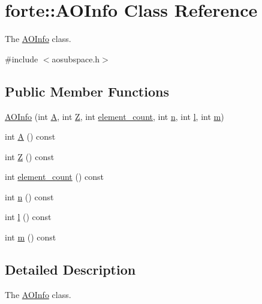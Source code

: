 \hypertarget{classforte_1_1_a_o_info}{}\section{forte\+:\+:A\+O\+Info Class Reference}
\label{classforte_1_1_a_o_info}


The \mbox{\hyperlink{classforte_1_1_a_o_info}{A\+O\+Info}} class.  




{\ttfamily \#include $<$aosubspace.\+h$>$}

\subsection*{Public Member Functions}
\begin{DoxyCompactItemize}
\item 
\mbox{\hyperlink{classforte_1_1_a_o_info_a74a368c1fa1b7cd773d3b6a040d0b57f}{A\+O\+Info}} (int \mbox{\hyperlink{classforte_1_1_a_o_info_aacbf6d9bbd3bc19b7f96a486e35f8996}{A}}, int \mbox{\hyperlink{classforte_1_1_a_o_info_ac71668d14738a2054f33d8da68fbf0bc}{Z}}, int \mbox{\hyperlink{classforte_1_1_a_o_info_aa597ea8252cbfac7e302417eaa3f9b37}{element\+\_\+count}}, int \mbox{\hyperlink{classforte_1_1_a_o_info_a71492e38fe610c5535809789eceea740}{n}}, int \mbox{\hyperlink{classforte_1_1_a_o_info_a51797dafa01c915f57b0c910d7e29d23}{l}}, int \mbox{\hyperlink{classforte_1_1_a_o_info_a4c08f15cd83b5d3cb1735144d3f822c8}{m}})
\item 
int \mbox{\hyperlink{classforte_1_1_a_o_info_aacbf6d9bbd3bc19b7f96a486e35f8996}{A}} () const
\item 
int \mbox{\hyperlink{classforte_1_1_a_o_info_ac71668d14738a2054f33d8da68fbf0bc}{Z}} () const
\item 
int \mbox{\hyperlink{classforte_1_1_a_o_info_aa597ea8252cbfac7e302417eaa3f9b37}{element\+\_\+count}} () const
\item 
int \mbox{\hyperlink{classforte_1_1_a_o_info_a71492e38fe610c5535809789eceea740}{n}} () const
\item 
int \mbox{\hyperlink{classforte_1_1_a_o_info_a51797dafa01c915f57b0c910d7e29d23}{l}} () const
\item 
int \mbox{\hyperlink{classforte_1_1_a_o_info_a4c08f15cd83b5d3cb1735144d3f822c8}{m}} () const
\end{DoxyCompactItemize}


\subsection{Detailed Description}
The \mbox{\hyperlink{classforte_1_1_a_o_info}{A\+O\+Info}} class. 

